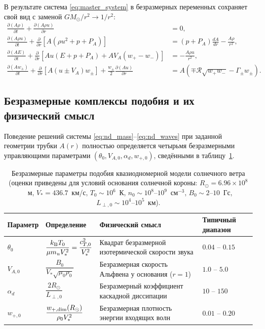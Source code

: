 \documentclass[11pt,a4paper]{article}
\begin{document}
В результате система \eqref{eq:master_system} в безразмерных переменных сохраняет свой вид с заменой $GM_\odot/r^2 \to 1/r^2$:
\begin{align}
\frac{\partial(A\rho)}{\partial t} + \frac{\partial(A\rho u)}{\partial r} &= 0,
\label{eq:nd_mass}\\[4pt]
\frac{\partial(A\rho u)}{\partial t} + \frac{\partial}{\partial r}\left[A(\rho u^2 + p + P_A)\right] &= (p + P_A)\frac{dA}{dr} - \frac{A\rho}{r^2},
\label{eq:nd_mom}\\[4pt]
\frac{\partial(A E)}{\partial t} + \frac{\partial}{\partial r}\left[A u(E + p + P_A) + A V_A(w_+ - w_-)\right] &= -\frac{A\rho u}{r^2},
\label{eq:nd_energy}\\[4pt]
\frac{\partial(A w_\pm)}{\partial t} + \frac{\partial}{\partial r}\left[A(u \pm V_A)w_\pm\right] + \frac{w_\pm}{2}\frac{\partial(Au)}{\partial r} &= A\left(\mp\mathcal{R}\sqrt{w_+ w_-} - \Gamma_\pm w_\pm\right).
\label{eq:nd_waves}
\end{align}

\subsection{Безразмерные комплексы подобия и их физический смысл}

Поведение решений системы \eqref{eq:nd_mass}--\eqref{eq:nd_waves} при заданной геометрии трубки $A(r)$ полностью определяется четырьмя безразмерными управляющими параметрами $(\theta_0, V_{A,0}, \alpha_d, w_{+,0})$, сведёнными в таблицу~\ref{tab:params}.

\begin{table}[ht!]
\centering
\caption{Безразмерные параметры подобия квазиодномерной модели солнечного ветра (оценки приведены для условий основания солнечной короны: $R_\odot = 6.96\times 10^8$~м, $V_* = 436.7$~км/с, $T_0 \sim 10^6$~К, $n_0 \sim 10^8\text{--}10^9$~см$^{-3}$, $B_0 \sim 2\text{--}10$~Гс, $L_{\perp,0} \sim 10^4\text{--}10^5$~км).}
\vspace{2mm}
\begin{tabular}{@{}llll@{}}
\toprule
\textbf{Параметр} & \textbf{Определение} & \textbf{Физический смысл} & \textbf{Типичный диапазон} \\
\midrule
$\theta_0$ & $\dfrac{k_{\rm B}T_0}{\mu m_u V_*^2} = \dfrac{c_{T,0}^2}{V_*^2}$ & Квадрат безразмерной изотермической скорости звука & $0.04 \text{ -- } 0.15$ \\[8pt]
$V_{A,0}$ & $\dfrac{B_0}{V_*\sqrt{\mu_0\rho_0}}$ & Безразмерная скорость Альфвена у основания ($r=1$) & $1.0 \text{ -- } 5.0$ \\[8pt]
$\alpha_d$ & $\dfrac{2 R_\odot}{L_{\perp,0}}$ & Безразмерный коэффициент каскадной диссипации & $10 \text{ -- } 150$ \\[8pt]
$w_{+,0}$ & $\dfrac{w_{+,{\rm dim}}(R_\odot)}{\rho_0 V_*^2}$ & Безразмерная плотность энергии входящих волн & $0.01 \text{ -- } 0.20$ \\
\bottomrule
\end{tabular}
\label{tab:params}
\end{table}
\end{document}
